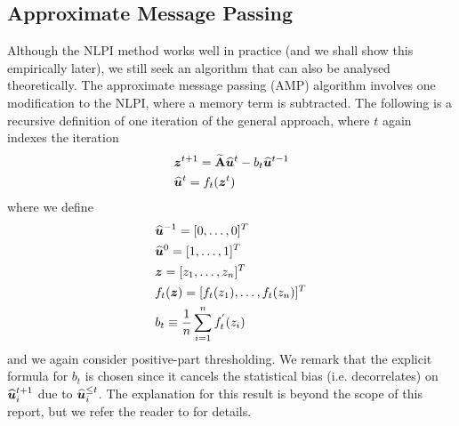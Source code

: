 
\subsection{Approximate Message Passing}
\label{subsec:approximateMessagePassing}

Although the NLPI method works well in practice (and we shall show this empirically later), we still seek an algorithm that can also be analysed theoretically. The approximate message passing (AMP) algorithm involves one modification to the NLPI, where a memory term is subtracted.
The following is a recursive definition of one iteration of the general approach, where $t$ again indexes the iteration
\begin{equation}
	\label{eq:AMPAlgorithm}
	\begin{split}
		&\vecvar{z}^{t+1} = \widetilde{\matvar{A}} \widehat{\vecvar{u}}^{t} - b_{t}\widehat{\vecvar{u}}^{t-1}\\
		&\widehat{\vecvar{u}}^{t} = f_{t}(\vecvar{z}^{t})
	\end{split}
\end{equation}
where we define
\begin{equation}
	\label{eq:AMPAlgorithmConditions}
	\begin{split}
		&\widehat{\vecvar{u}}^{-1} = \transpose{[0,\dots,0]} \\
		&\widehat{\vecvar{u}}^{0} = \transpose{[1,\dots,1]} \\
		&\vecvar{z} = \transpose{[z_{1},\dots,z_{n}]} \\
		&f_{t}(\vecvar{z}) = \transpose{[f_{t}(z_{1}),\dots,f_{t}(z_{n})]} \\
		&b_{t} \equiv \frac{1}{n}\sum_{i=1}^{n}f_{t}^{'}(z_{i})
	\end{split}
\end{equation}
and we again consider positive-part thresholding.
We remark that the explicit formula for $b_{t}$ is chosen since it cancels the statistical bias (i.e. decorrelates) on $\widehat{\vecvar{u}}^{t+1}_{i}$ due to $\widehat{\vecvar{u}}^{\leq t}_{i}$.
The explanation for this result is beyond the scope of this report, but we refer the reader to \cite{DMM09,MDM10,BM11,Mon11,BKS13} for details.
